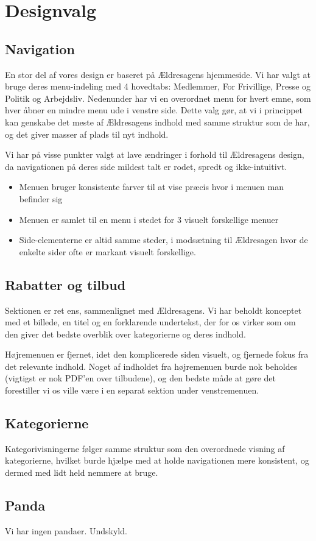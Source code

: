 \section{Designvalg}
\subsection{Navigation}
En stor del af vores design er baseret på Ældresagens hjemmeside. Vi har
valgt at bruge deres menu-indeling med 4 hovedtabs: Medlemmer, For Frivillige,
Presse og Politik og Arbejdsliv. Nedenunder har vi en overordnet menu for hvert
emne, som hver åbner en mindre menu ude i venstre side. Dette valg gør, at vi i
princippet kan genskabe det meste af Ældresagens indhold med samme struktur som de
har, og det giver masser af plads til nyt indhold. 

Vi har på visse punkter valgt at lave ændringer i forhold til Ældresagens design, da
navigationen på deres side mildest talt er rodet, spredt og ikke-intuitivt. 

\begin{itemize}
\item Menuen bruger konsistente farver til at vise præcis hvor i menuen man befinder sig
\item Menuen er samlet til en menu i stedet for 3 visuelt forskellige menuer
\item Side-elementerne er altid samme steder, i modsætning til Ældresagen hvor de enkelte sider
      ofte er markant visuelt forskellige.
\end{itemize}

\subsection{Rabatter og tilbud}
Sektionen er ret ens, sammenlignet med Ældresagens. Vi har beholdt konceptet med et billede, en titel og en forklarende undertekst, der for os virker som om den giver det bedste overblik over kategorierne og deres indhold.

Højremenuen er fjernet, idet den komplicerede siden visuelt, og fjernede fokus fra det relevante indhold.
Noget af indholdet fra højremenuen burde nok beholdes (vigtigst er nok PDF'en over tilbudene), og den bedste måde at gøre det forestiller vi os ville være i en separat sektion under venstremenuen. 

\subsection{Kategorierne}
Kategorivisningerne følger samme struktur som den overordnede visning af kategorierne, hvilket burde hjælpe med at holde navigationen mere konsistent, og dermed med lidt held nemmere at bruge. 

\subsection{Panda}
Vi har ingen pandaer. Undskyld.
